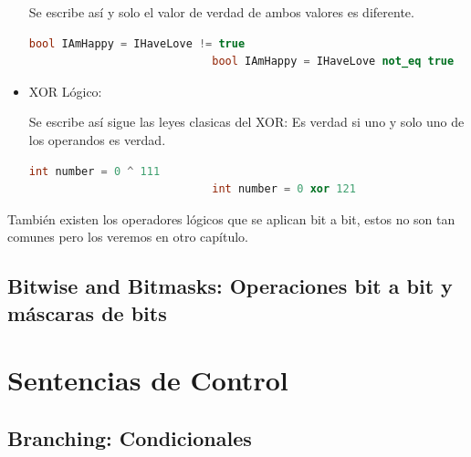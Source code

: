 \documentclass[12pt, fleqn]{report}                             %
\theoremstyle{break}                                            %
\begin{document}
\begin{itemize}
                        Se escribe así y solo el valor de verdad de ambos valores es diferente.
                        \begin{lstlisting}[language=C++, gobble=28]
                            bool IAmHappy = IHaveLove != true
                            bool IAmHappy = IHaveLove not_eq true
                        \end{lstlisting}

                    \item XOR Lógico: 
                    
                        Se escribe así sigue las leyes clasicas del XOR: Es verdad si uno y solo uno de los operandos
                        es verdad.
                        \begin{lstlisting}[language=C++, gobble=28]
                            int number = 0 ^ 111
                            int number = 0 xor 121
                        \end{lstlisting}
                \end{itemize}

            También existen los operadores lógicos que se aplican bit a bit, estos no son tan comunes
            pero los veremos en otro capítulo.

            \clearpage
            \subsection{Bitwise and Bitmasks: Operaciones bit a bit y máscaras de bits}

        \clearpage
        \section{Sentencias de Control}

            \subsection{Branching: Condicionales}
\end{document}
